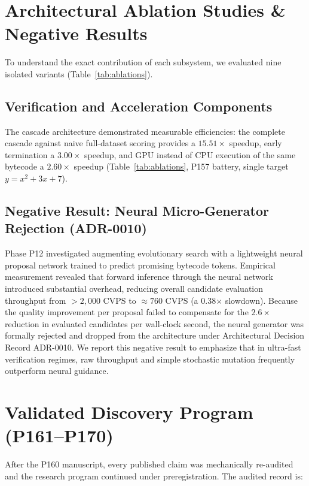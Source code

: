 \documentclass[11pt,a4paper]{article}
\begin{document}
\section{Architectural Ablation Studies \& Negative Results}
To understand the exact contribution of each subsystem, we evaluated nine isolated variants (Table~\ref{tab:ablations}).

\subsection{Verification and Acceleration Components}
The cascade architecture demonstrated measurable efficiencies: the complete cascade against naive
full-dataset scoring provides a $15.51\times$ speedup, early termination a $3.00\times$ speedup,
and GPU instead of CPU execution of the same bytecode a $2.60\times$ speedup (Table~\ref{tab:ablations},
P157 battery, single target $y = x^2+3x+7$).

\subsection{Negative Result: Neural Micro-Generator Rejection (ADR-0010)}
Phase P12 investigated augmenting evolutionary search with a lightweight neural proposal network trained to predict promising bytecode tokens. Empirical measurement revealed that forward inference through the neural network introduced substantial overhead, reducing overall candidate evaluation throughput from $>2,000$ CVPS to $\approx 760$ CVPS (a 0.38$\times$ slowdown). Because the quality improvement per proposal failed to compensate for the $2.6\times$ reduction in evaluated candidates per wall-clock second, the neural generator was formally rejected and dropped from the architecture under Architectural Decision Record ADR-0010. We report this negative result to emphasize that in ultra-fast verification regimes, raw throughput and simple stochastic mutation frequently outperform neural guidance.

\section{Validated Discovery Program (P161--P170)}
\label{sec:validated-program}
After the P160 manuscript, every published claim was mechanically re-audited and the research
program continued under preregistration. The audited record is:
\end{document}

